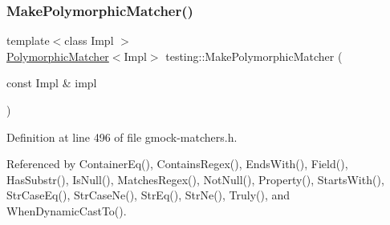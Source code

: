 \subsubsection{\texorpdfstring{Make\+Polymorphic\+Matcher()}{MakePolymorphicMatcher()}}
{\footnotesize\ttfamily template$<$class Impl $>$ \\
\hyperlink{classtesting_1_1PolymorphicMatcher}{Polymorphic\+Matcher}$<$Impl$>$ testing\+::\+Make\+Polymorphic\+Matcher (\begin{DoxyParamCaption}\item[{const Impl \&}]{impl }\end{DoxyParamCaption})\hspace{0.3cm}{\ttfamily [inline]}}



Definition at line 496 of file gmock-\/matchers.\+h.



Referenced by Container\+Eq(), Contains\+Regex(), Ends\+With(), Field(), Has\+Substr(), Is\+Null(), Matches\+Regex(), Not\+Null(), Property(), Starts\+With(), Str\+Case\+Eq(), Str\+Case\+Ne(), Str\+Eq(), Str\+Ne(), Truly(), and When\+Dynamic\+Cast\+To().


